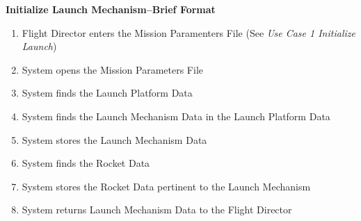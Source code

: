 \documentclass[letterpaper]{article}
\begin{document}
\noindent
\textbf{Initialize Launch Mechanism--Brief Format}
\begin{enumerate}
   \item Flight Director enters the Mission Paramenters File (See
      \textit{Use Case 1 Initialize Launch})
   \item System opens the Mission Parameters File
   \item System finds the Launch Platform Data
   \item System finds the Launch Mechanism Data in the Launch
      Platform Data
   \item System stores the Launch Mechanism Data
   \item System finds the Rocket Data
   \item System stores the Rocket Data pertinent to the Launch
      Mechanism
   \item System returns Launch Mechanism Data to the Flight Director
\end{enumerate}
\end{document}
